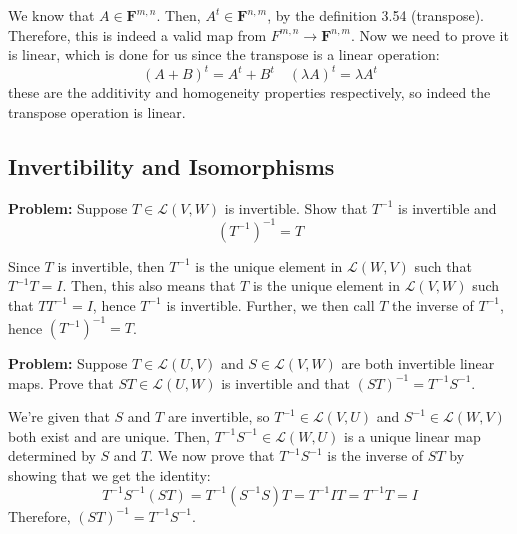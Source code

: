 \documentclass[10pt]{article}
\newcommand{\F}{\mathbf F}
\newenvironment{problem}{\textbf{Problem:}}{}
\begin{document}
	\begin{solution}
		We know that \( A \in \F^{m, n} \). Then, \( A^{t} \in \F^{n, m} \), by the definition 3.54 (transpose). 
		Therefore, this is indeed a valid map from \( F^{m, n} \to \F^{n, m} \). Now we need to prove it is linear, 
		which is done for us since the transpose is a linear operation:
		\[
			(A + B)^{t} = A^{t} + B^{t} \quad (\lambda A)^{t} = \lambda A^{t}
		\] 
		these are the additivity and homogeneity properties respectively, so indeed the transpose operation is linear.
	\end{solution}

	\subsection{Invertibility and Isomorphisms}
	\begin{problem}
		Suppose \( T \in \mathcal L(V, W) \) is invertible. Show that \( T^{-1} \) is invertible and 
		\[
			(T^{-1})^{-1} = T
		\] 
	\end{problem}

	\begin{solution}
		Since \( T \) is invertible, then \( T^{-1} \) is the unique element in \( \mathcal L(W, V) \) such that 
		\( T^{-1}T = I \). Then, this also means that \( T \) is the unique element in \( \mathcal  L(V, W) \) 
		such that \( T T^{-1} = I \), hence \( T^{-1} \) is invertible. Further, we then call \( T \) the 
		inverse of \( T^{-1} \), hence \( (T^{-1})^{-1} = T \). 
	\end{solution}
	
	\begin{problem}
		Suppose \( T \in \mathcal L(U, V) \) and \( S \in \mathcal L(V, W) \) are both invertible linear maps. 
		Prove that \( ST \in \mathcal L(U, W) \) is invertible and that \( (ST)^{-1} = T^{-1}S^{-1} \). 
	\end{problem}

	\begin{solution}
		We're given that \( S \) and \( T \) are invertible, so \( T^{-1} \in \mathcal L (V, U) \) 
		and \( S^{-1} \in \mathcal L(W, V) \) both exist and are unique. Then, \( T^{-1}S^{-1} \in \mathcal L(W, U)\) 
		is a unique linear map determined by \( S \) and \( T \). We now prove that \( T^{-1}S^{-1} \) is the inverse 
		of \( ST \) by showing that we get the identity:
		\[
			T^{-1}S^{-1}(ST) = T^{-1} (S^{-1} S) T = T^{-1} I T = T^{-1} T = I
		\] 
		Therefore, \( (ST)^{-1} = T^{-1} S^{-1} \). 
	\end{solution}
	
\end{document}
